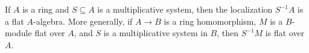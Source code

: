 If $A$ is a ring and $S \subseteq A$ is a multiplicative system, then the localization $S^{-1}A$ is a flat $A$-algebra. More generally, if $A \to B$ is a ring homomorphism, $M$ is a $B$-module flat over $A$, and $S$ is a multiplicative system in $B$, then $S^{-1}M$ is flat over $A$.
